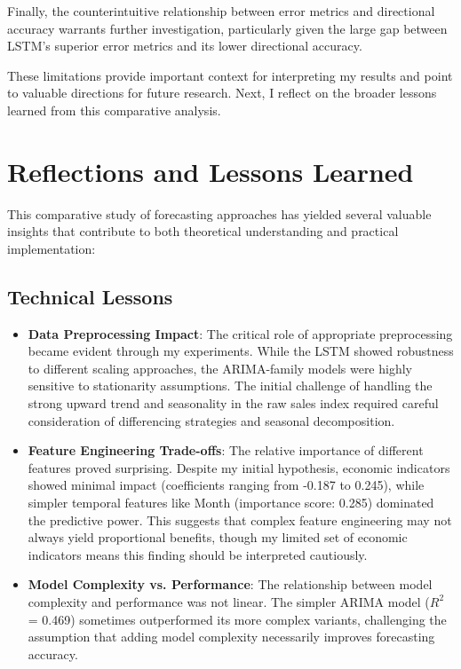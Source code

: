 \documentclass[12pt,a4paper]{report}
\begin{document}
Finally, the counterintuitive relationship between error metrics and directional accuracy warrants further investigation, particularly given the large gap between LSTM's superior error metrics and its lower directional accuracy.

These limitations provide important context for interpreting my results and point to valuable directions for future research. Next, I reflect on the broader lessons learned from this comparative analysis.

\section{Reflections and Lessons Learned}

This comparative study of forecasting approaches has yielded several valuable insights that contribute to both theoretical understanding and practical implementation:

\subsection{Technical Lessons}
\begin{itemize}
    \item \textbf{Data Preprocessing Impact}: The critical role of appropriate preprocessing became evident through my experiments. While the LSTM showed robustness to different scaling approaches, the ARIMA-family models were highly sensitive to stationarity assumptions. The initial challenge of handling the strong upward trend and seasonality in the raw sales index required careful consideration of differencing strategies and seasonal decomposition.
    
    \item \textbf{Feature Engineering Trade-offs}: The relative importance of different features proved surprising. Despite my initial hypothesis, economic indicators showed minimal impact (coefficients ranging from -0.187 to 0.245), while simpler temporal features like Month (importance score: 0.285) dominated the predictive power. This suggests that complex feature engineering may not always yield proportional benefits, though my limited set of economic indicators means this finding should be interpreted cautiously.
    
    \item \textbf{Model Complexity vs. Performance}: The relationship between model complexity and performance was not linear. The simpler ARIMA model ($R^2$ = 0.469) sometimes outperformed its more complex variants, challenging the assumption that adding model complexity necessarily improves forecasting accuracy.
\end{itemize}
\end{document}
